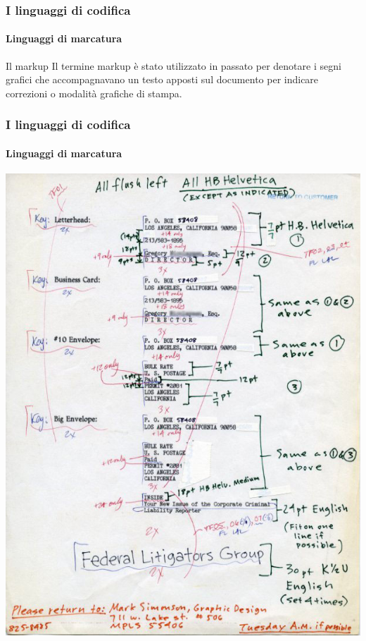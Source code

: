 \documentclass{beamer}
\begin{document}
\begin{frame}
	\frametitle{I linguaggi di codifica}
	\framesubtitle{Linguaggi di marcatura}
	\addtocounter{nframe}{1}

	\begin{block}{Il markup}
		Il termine markup è stato utilizzato in passato per denotare i segni grafici che accompagnavano un testo apposti sul documento per indicare correzioni o modalità grafiche di stampa.
	\end{block}

\end{frame}

\begin{frame}
	\frametitle{I linguaggi di codifica}
	\framesubtitle{Linguaggi di marcatura}
	\addtocounter{nframe}{1}

	\begin{center}
		\includegraphics[width=.7\textwidth]{imgs/markup001.jpg}
	\end{center}

\end{frame}
\end{document}
